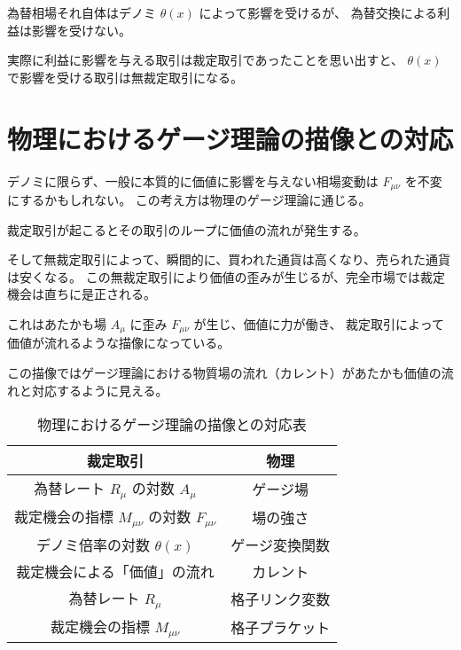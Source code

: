 \documentclass[uplatex]{jsarticle}
\begin{document}
為替相場それ自体はデノミ $\theta(x)$ によって影響を受けるが、
為替交換による利益は影響を受けない。

実際に利益に影響を与える取引は裁定取引であったことを思い出すと、
$\theta(x)$ で影響を受ける取引は無裁定取引になる。







\section{物理におけるゲージ理論の描像との対応}

デノミに限らず、一般に本質的に価値に影響を与えない相場変動は
$F_{\mu \nu}$
を不変にするかもしれない。
この考え方は物理のゲージ理論に通じる。

裁定取引が起こるとその取引のループに価値の流れが発生する。

そして無裁定取引によって、瞬間的に、買われた通貨は高くなり、売られた通貨は安くなる。
この無裁定取引により価値の歪みが生じるが、完全市場では裁定機会は直ちに是正される。

これはあたかも場 $A_{\mu}$ に歪み $F_{\mu \nu}$ が生じ、価値に力が働き、
裁定取引によって価値が流れるような描像になっている。

この描像ではゲージ理論における物質場の流れ（カレント）があたかも価値の流れと対応するように見える。


\begin{table}[H]
	\centering
	\begin{tabular}{|c|c|}
		\hline
		裁定取引                                    & 物理      \\ \hline \hline
		為替レート $R_{\mu}$ の対数 $A_{\mu}$           & ゲージ場    \\ \hline
		裁定機会の指標 $M_{\mu \nu}$ の対数 $F_{\mu \nu}$ & 場の強さ    \\ \hline
		デノミ倍率の対数 $\theta(x)$                    & ゲージ変換関数 \\ \hline
		裁定機会による「価値」の流れ                          & カレント    \\ \hline
		為替レート $R_{\mu}$                         & 格子リンク変数 \\ \hline
		裁定機会の指標 $M_{\mu \nu}$                   & 格子プラケット \\ \hline
	\end{tabular}
	\caption{物理におけるゲージ理論の描像との対応表}
	\label{tab:tab202502281751}
\end{table}
\end{document}
